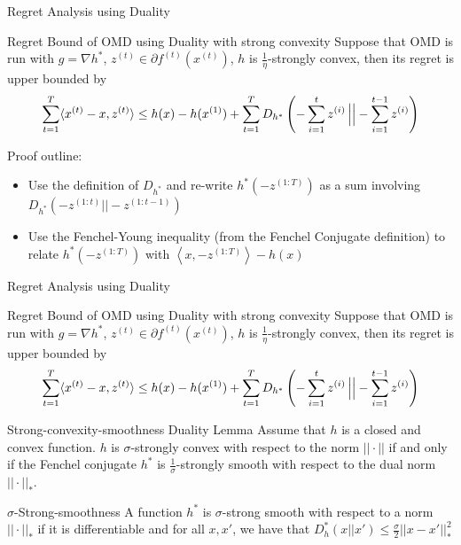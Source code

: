 \begin{frame}{Regret Analysis using Duality}
    \small
    \begin{block}{Regret Bound of OMD using Duality with strong convexity}
        Suppose that OMD is run with $g = \nabla h^*$, $z^{(t)} \in \partial f^{(t)}(x^{(t)})$, $h$ is $\frac{1}{\eta}$-strongly convex, then its regret is upper bounded by
        $$
        \sum_{t=1}^T\langle x^{(t)} - x, z^{(t)} \rangle \leq h(x) - h(x^{(1)}) + \sum_{t=1}^T D_{h^*}\left(-\sum_{i=1}^t z^{(i)} \left\vert \vphantom{\frac{a}{b}} \right\vert  -\sum_{i=1}^{t-1}z^{(i)}\right)
        $$
    \end{block}\pause
    Proof outline:
    \begin{itemize}
        \item Use the definition of $D_{h^*}$ and re-write $h^{*}(-z^{(1:T)})$ as a sum involving $D_{h^*}(-z^{(1:t)}||-z^{(1:t-1)})$
        \item Use the Fenchel-Young inequality (from the Fenchel Conjugate definition) to relate $h^{*}(-z^{(1:T)})$ with $\left\langle x, -z^{(1:T)}\right\rangle - h(x)$
    \end{itemize}
\end{frame}

\begin{frame}{Regret Analysis using Duality}
    \small
    \begin{block}{Regret Bound of OMD using Duality with strong convexity}
        Suppose that OMD is run with $g = \nabla h^*$, $z^{(t)} \in \partial f^{(t)}(x^{(t)})$, $h$ is $\frac{1}{\eta}$-strongly convex, then its regret is upper bounded by
        $$
        \sum_{t=1}^T\langle x^{(t)} - x, z^{(t)} \rangle \leq h(x) - h(x^{(1)}) + \sum_{t=1}^T D_{h^*}\left(-\sum_{i=1}^t z^{(i)} \left\vert \vphantom{\frac{a}{b}} \right\vert  -\sum_{i=1}^{t-1}z^{(i)}\right)
        $$
    \end{block}\pause
    \begin{block}{Strong-convexity-smoothness Duality Lemma}
        Assume that $h$ is a closed and convex function. $h$ is $\sigma$-strongly convex with respect to the norm $||\cdot||$ if and only if the Fenchel conjugate $h^*$ is $\frac{1}{\sigma}$-strongly smooth with respect to the dual norm $||\cdot||_*$.
    \end{block}\pause
    \begin{block}{$\sigma$-Strong-smoothness}
        A function $h^*$ is $\sigma$-strong smooth with respect to a norm $||\cdot||_*$ if it is differentiable and for all $x, x'$, we have that
        $
        D_h^*(x||x') \leq \frac{\sigma}{2}||x - x'||_*^2
        $
    \end{block}
\end{frame}

